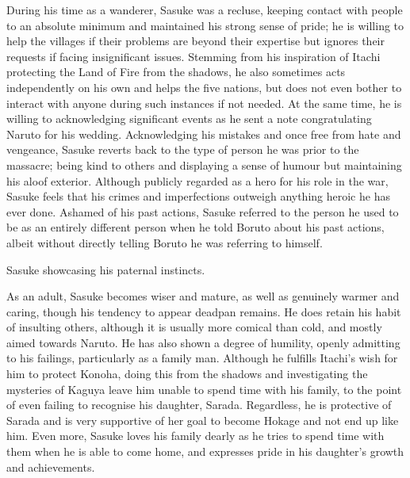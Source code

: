 \documentclass[a4paper,12pt]{article}
\begin{document}
During his time as a wanderer, Sasuke was a recluse, keeping contact with people to an absolute minimum and maintained his strong sense of pride; he is willing to help the villages if their problems are beyond their expertise but ignores their requests if facing insignificant issues. Stemming from his inspiration of Itachi protecting the Land of Fire from the shadows, he also sometimes acts independently on his own and helps the five nations, but does not even bother to interact with anyone during such instances if not needed. At the same time, he is willing to acknowledging significant events as he sent a note congratulating Naruto for his wedding. Acknowledging his mistakes and once free from hate and vengeance, Sasuke reverts back to the type of person he was prior to the massacre; being kind to others and displaying a sense of humour but maintaining his aloof exterior. Although publicly regarded as a hero for his role in the war, Sasuke feels that his crimes and imperfections outweigh anything heroic he has ever done. Ashamed of his past actions, Sasuke referred to the person he used to be as an entirely different person when he told Boruto about his past actions, albeit without directly telling Boruto he was referring to himself.\\ \par \vspace{0.5cm}

Sasuke showcasing his paternal instincts.\\ \par \vspace{0.5cm}

As an adult, Sasuke becomes wiser and mature, as well as genuinely warmer and caring, though his tendency to appear deadpan remains. He does retain his habit of insulting others, although it is usually more comical than cold, and mostly aimed towards Naruto. He has also shown a degree of humility, openly admitting to his failings, particularly as a family man. Although he fulfills Itachi's wish for him to protect Konoha, doing this from the shadows and investigating the mysteries of Kaguya leave him unable to spend time with his family, to the point of even failing to recognise his daughter, Sarada. Regardless, he is protective of Sarada and is very supportive of her goal to become Hokage and not end up like him. Even more, Sasuke loves his family dearly as he tries to spend time with them when he is able to come home, and expresses pride in his daughter's growth and achievements.\\ \par \vspace{0.5cm}
\end{document}
